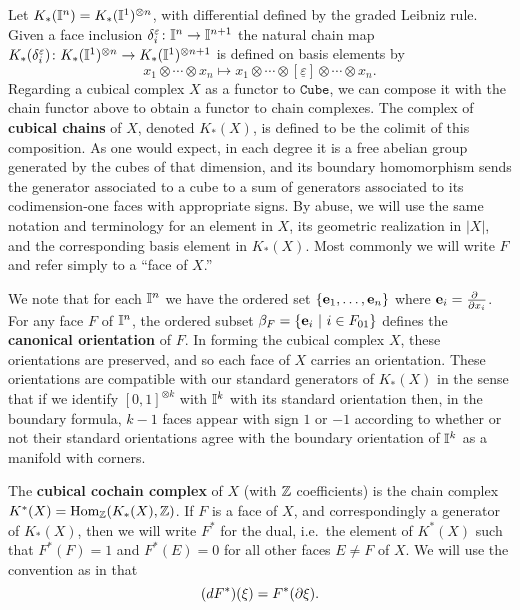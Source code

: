 Let $K_*(\mathbb{I}^n) = K_*(\mathbb{I}^1)^{ \otimes n}$, with differential defined by the graded Leibniz rule.
Given a face inclusion $\delta_i^{\varepsilon} \colon \mathbb{I}^n \to \mathbb{I}^{n+1}$ the natural chain map $K_*(\delta_i^{\varepsilon}) \colon K_*(\mathbb{I}^1)^{ \otimes n} \to K_*(\mathbb{I}^1)^{ \otimes n+1}$ is defined on basis elements by
\begin{equation*}
	x_1 \otimes \cdots \otimes x_n \mapsto
	x_1 \otimes \cdots \otimes [\underline{\varepsilon}] \otimes \cdots \otimes x_n.
\end{equation*}
Regarding a cubical complex $X$ as a functor to $\mathtt{Cube}$, we can compose it with the chain functor above to obtain a functor to chain complexes.
The complex of \textbf{cubical chains} of $X$, denoted $K_*(X)$, is defined to be the colimit of this composition.
As one would expect, in each degree it is a free abelian group generated by the cubes of that dimension, and its boundary homomorphism sends the
generator associated to a cube to a sum of generators associated to its codimension-one faces with appropriate signs.
By abuse, we will use the same notation and terminology for an element in $X$, its geometric realization in $|X|$,
and the corresponding basis element in $K_*(X)$.
Most commonly we will write $F$ and refer simply to a ``face of $X$.''

We note that for each $\mathbb{I}^n$ we have the ordered set $\{\mathbf{e}_1, \dots, \mathbf{e}_n\}$ where $\mathbf{e}_i = \frac{\partial\ }{\partial x_i}$.
For any face $F$ of $\mathbb{I}^n$, the ordered subset $\beta_F = \{\mathbf{e}_i\ |\ i \in F_{01}\}$ defines the \textbf{canonical orientation} of $F$.
In forming the cubical complex $X$, these orientations are preserved, and so each face of $X$ carries an orientation.
These orientations are compatible with our standard generators of $K_*(X)$ in the sense that if we identify $[0,1]^{ \otimes k}$ with $\mathbb{I}^k$ with its standard orientation then, in the boundary formula, $k-1$ faces appear with sign $1$ or $-1$ according to whether or not their standard orientations agree with the boundary orientation of $\mathbb{I}^k$ as a manifold with corners.

The \textbf{cubical cochain complex} of $X$ (with $\mathbb{Z}$ coefficients) is the chain complex $K^*(X) = \textup{Hom}_{\mathbb{Z}}(K_*(X), \mathbb{Z})$.
If $F$ is a face of $X$, and correspondingly a generator of $K_*(X)$, then we will write $F^*$ for the dual, i.e.\ the element of $K^*(X)$ such that $F^*(F) = 1$ and $F^*(E) = 0$ for all other faces $E\neq F$ of $X$.
We will use the convention as in \cite{Mun84} that
$$(dF^*)(\xi) = F^*(\partial \xi).$$

